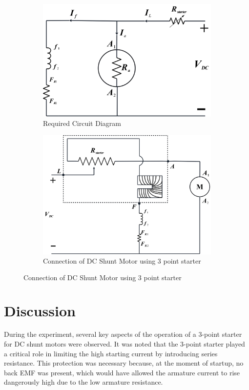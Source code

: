 \documentclass[a4paper,12pt]{article}
\begin{document}
	\begin{figure}[H]
	\centering
	\begin{subfigure}[t]{0.9\textwidth}
		\centering
	\includegraphics[width=.7\linewidth]{Images/Drawing06}
	\caption{Required Circuit Diagram}
	\vspace{0.1cm}
	\end{subfigure}

	\begin{subfigure}[t]{1\textwidth}
		\centering
		\includegraphics[width=0.9\linewidth]{Images/Drawing05}
	\caption{Connection of DC Shunt Motor using 3 point starter}
	\end{subfigure}
\end{figure}

\section{Discussion}
During the experiment, several key aspects of the operation of a 3-point starter for DC shunt motors were observed. It was noted that the 3-point starter played a critical role in limiting the high starting current by introducing series resistance. This protection was necessary because, at the moment of startup, no back EMF was present, which would have allowed the armature current to rise dangerously high due to the low armature resistance.
\end{document}
